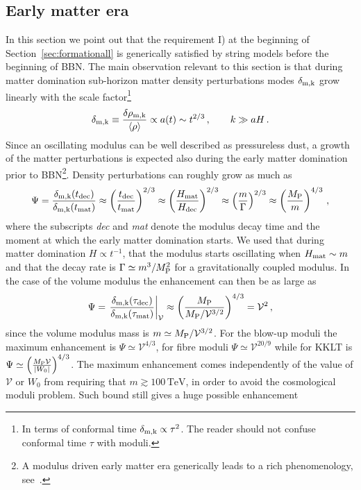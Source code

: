 \documentclass[11pt,a4paper]{article}
\newcommand{\V}{\mathcal{V}}
\begin{document}
\subsection{Early matter era}
\label{sec:EarlyMatterEra}

In this section we point out that the requirement I) at the beginning of Section~\ref{sec:formationall} is generically satisfied by string models before the beginning of BBN. The main observation relevant to this section is that during matter domination sub-horizon matter density perturbations modes $\delta_{\rm m,k}$ grow linearly with the scale factor\footnote{In terms of conformal time $\delta_{\rm m,k} \propto \tau^2$. The reader should not confuse conformal time $\tau$ with moduli.}
\begin{equation} 
\delta_{\rm m,k} \equiv \frac{\delta \rho_{\rm m,k}}{\langle \rho \rangle} \propto a(t) \sim t^{2/3} \,, \qquad k \gg a H \,.
\end{equation}
Since an oscillating modulus can be well described as pressureless dust, a growth of the matter perturbations is expected also during the early matter domination prior to BBN\footnote{A modulus driven early matter era generically leads to a rich phenomenology, see~\cite{Kane:2015jia, Acharya:2008bk, Acharya:2009zt, Acharya:2010af, Aparicio:2015sda, Aparicio:2016qqb, Allahverdi:2013noa, Allahverdi:2016yws}.}. Density perturbations can roughly grow as much as
\begin{equation}
\Psi = \frac{\delta_{\rm m,k}(t_{\rm dec})}{\delta_{\rm m,k}(t_{\rm mat})} \approx \left(\frac{t_{\rm dec}}{t_{\rm mat}}\right)^{2/3} \approx \left(\frac{H_{\rm mat}}{H_{\rm dec}}\right)^{2/3} \approx \left(\frac{m}{\Gamma}\right)^{2/3} \approx \left(\frac{M_{\rm P}}{m}\right)^{4/3} \,,
\end{equation}
where the subscripts \textit{dec} and \textit{mat} denote the modulus decay time and the moment at which the early matter domination starts.  We used that during matter domination $H \propto t^{-1}$, that the modulus starts oscillating when $H_{\rm mat} \sim m$ and that the decay rate is $\Gamma \simeq m^3/M_{\rm P}^2$ for a gravitationally coupled modulus. In the case of the volume modulus the enhancement can then be as large as
\begin{equation}
\Psi = \left.\frac{\delta_{\rm m,k}(\tau_{\rm dec})}{\delta_{\rm m,k}(\tau_{\rm mat})}\right|_{\V}  \approx \left(\frac{M_{\rm P}}{M_{\rm P}/\V^{3/2}}\right)^{4/3} = \V^2 \,,
\end{equation}
since the volume modulus mass is $m \simeq M_{\rm P}/{\V^{3/2}}$. For the blow-up moduli the maximum enhancement is $\Psi \simeq \V^{4/3}$, for fibre moduli $\Psi \simeq \V^{20/9}$ while for KKLT is $\Psi \simeq \left(\frac{M_{\rm P} \V}{|W_0|}\right)^{4/3}$. The maximum enhancement comes independently of the value of $\mathcal{V}$ or $W_0$ from requiring that $m \gtrsim 100 \, \text{TeV}$, in order to avoid the cosmological moduli problem. Such bound still gives a huge possible enhancement~\cite{Assadullahi:2009nf}
\end{document}
